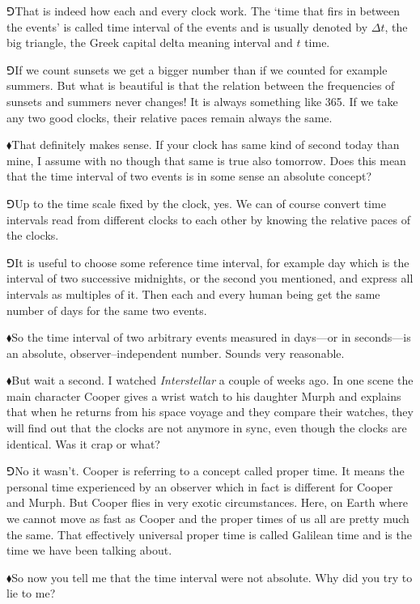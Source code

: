 \documentclass[10pt,oneside%
]{memoir}
\newcommand{\hea}{\(\blacklozenge\)\;}
\newcommand{\heb}{\(\Game\)\;}
\begin{document}
\heb That is indeed how each and every clock work. The `time that firs in between the events' is called time interval of the events and is usually denoted by \(\Delta t\), the big triangle, the Greek capital delta meaning interval and \(t\) time.

\heb If we count sunsets we get a bigger number than if we counted for example summers. But what is beautiful is that the relation between the frequencies of sunsets and summers never changes! It is always something like 365. If we take any two good clocks, their relative paces remain always the same.

\hea That definitely makes sense. If your clock has same kind of second today than mine, I assume with no though that same is true also tomorrow. Does this mean that the time interval of two events is in some sense an absolute concept?

\heb Up to the time scale fixed by the clock, yes. We can of course convert time intervals read from different clocks to each other by knowing the relative paces of the clocks.

\heb It is useful to choose some reference time interval, for example day which is the interval of two successive midnights, or the second you mentioned, and express all intervals as multiples of it. Then each and every human being get the same number of days for the same two events.

\hea So the time interval of two arbitrary events measured in days---or in seconds---is an absolute, observer--independent number. Sounds very reasonable.

\hea But wait a second. I watched \emph{Interstellar} a couple of weeks ago. In one scene the main character Cooper gives a wrist watch to his daughter Murph and explains that when he returns from his space voyage and they compare their watches, they will find out that the clocks are not anymore in sync, even though the clocks are identical. Was it crap or what?

\heb No it wasn't. Cooper is referring to a concept called proper time. It means the personal time experienced by an observer which in fact is different for Cooper and Murph. But Cooper flies in very exotic circumstances. Here, on Earth where we cannot move as fast as Cooper and the proper times of us all are pretty much the same. That effectively universal proper time is called Galilean time and is the time we have been talking about.

\hea So now you tell me that the time interval were not absolute. Why did you try to lie to me?
\end{document}
